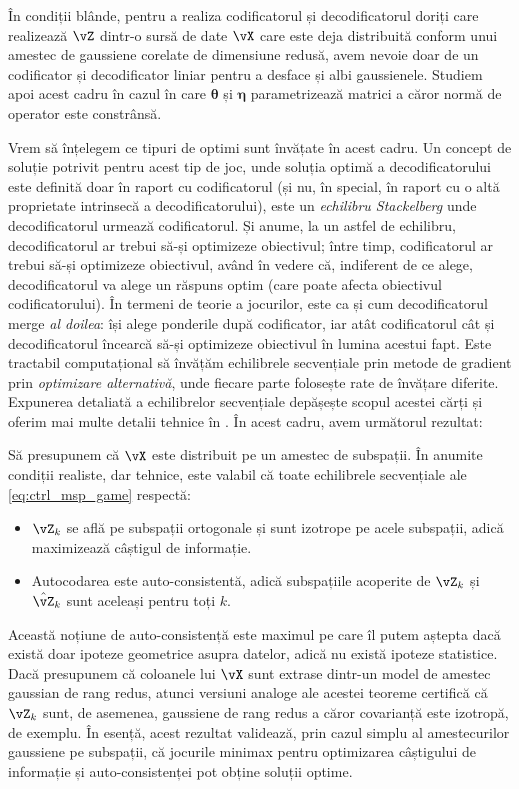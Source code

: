 \documentclass[../../book-main_ro.tex]{subfiles}
\begin{document}
În condiții blânde, pentru a realiza codificatorul și decodificatorul doriți care realizează \(\vZ\) dintr-o sursă de date \(\vX\) care este deja distribuită conform unui amestec de gaussiene corelate de dimensiune redusă, avem nevoie doar de un codificator și decodificator liniar pentru a desface și albi gaussienele. Studiem apoi acest cadru în cazul în care \(\bm \theta\) și \(\bm \eta\) parametrizează matrici a căror normă de operator este constrânsă.

Vrem să înțelegem ce tipuri de optimi sunt învățate în acest cadru. Un concept de soluție potrivit pentru acest tip de joc, unde soluția optimă a decodificatorului este definită doar în raport cu codificatorul (și nu, în special, în raport cu o altă proprietate intrinsecă a decodificatorului), este un \textit{echilibru Stackelberg} unde decodificatorul urmează codificatorul.
Și anume, la un astfel de echilibru, decodificatorul ar trebui să-și optimizeze obiectivul; între timp, codificatorul ar trebui să-și optimizeze obiectivul, având în vedere că, indiferent de ce alege, decodificatorul va alege un răspuns optim (care poate afecta obiectivul codificatorului). În termeni de teorie a jocurilor, este ca și cum decodificatorul merge \textit{al doilea}: își alege ponderile după codificator, iar atât codificatorul cât și decodificatorul încearcă să-și optimizeze obiectivul în lumina acestui fapt. Este tractabil computațional să învățăm echilibrele secvențiale prin metode de gradient prin \textit{optimizare alternativă}, unde fiecare parte folosește rate de învățare diferite. Expunerea detaliată a echilibrelor secvențiale depășește scopul acestei cărți și oferim mai multe detalii tehnice în . În acest cadru, avem următorul rezultat:
\begin{theorem}\label{thm:ctrl_theory}
    Să presupunem că \(\vX\) este distribuit pe un amestec de subspații. În anumite condiții realiste, dar tehnice, este valabil că toate echilibrele secvențiale ale \eqref{eq:ctrl_msp_game} respectă:
    \begin{itemize}
        \item \(\vZ_{k}\) se află pe subspații ortogonale și sunt izotrope pe acele subspații, adică maximizează câștigul de informație.
        \item Autocodarea este auto-consistentă, adică subspațiile acoperite de \(\vZ_{k}\) și \(\hat{\vZ}_{k}\) sunt aceleași pentru toți \(k\).
    \end{itemize}
\end{theorem}
Această noțiune de auto-consistență este maximul pe care îl putem aștepta dacă există doar ipoteze geometrice asupra datelor, adică nu există ipoteze statistice. Dacă presupunem că coloanele lui \(\vX\) sunt extrase dintr-un model de amestec gaussian de rang redus, atunci versiuni analoge ale acestei teoreme certifică că \(\vZ_{k}\) sunt, de asemenea, gaussiene de rang redus a căror covarianță este izotropă, de exemplu.
În esență, acest rezultat validează, prin cazul simplu al amestecurilor gaussiene pe subspații, că jocurile minimax pentru optimizarea câștigului de informație și auto-consistenței pot obține soluții optime.
\end{document}

